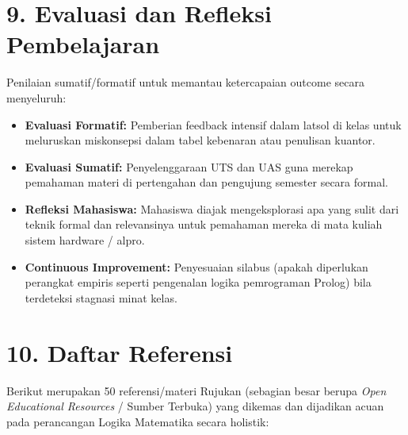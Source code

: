 \documentclass[12pt,a4paper]{article}
\begin{document}
\vspace{0.5cm}

\section*{9. Evaluasi dan Refleksi Pembelajaran}

Penilaian sumatif/formatif untuk memantau ketercapaian outcome secara menyeluruh:

\begin{itemize}[leftmargin=*]
  \item \textbf{Evaluasi Formatif:} Pemberian feedback intensif dalam latsol di kelas untuk meluruskan miskonsepsi dalam tabel kebenaran atau penulisan kuantor.
  \item \textbf{Evaluasi Sumatif:} Penyelenggaraan UTS dan UAS guna merekap pemahaman materi di pertengahan dan pengujung semester secara formal.
  \item \textbf{Refleksi Mahasiswa:} Mahasiswa diajak mengeksplorasi apa yang sulit dari teknik formal dan relevansinya untuk pemahaman mereka di mata kuliah sistem hardware / alpro.
  \item \textbf{Continuous Improvement:} Penyesuaian silabus (apakah diperlukan perangkat empiris seperti pengenalan logika pemrograman Prolog) bila terdeteksi stagnasi minat kelas.
\end{itemize}

\vspace{0.5cm}

\section*{10. Daftar Referensi}

Berikut merupakan 50 referensi/materi Rujukan (sebagian besar berupa \textit{Open Educational Resources} / Sumber Terbuka) yang dikemas dan dijadikan acuan pada perancangan Logika Matematika secara holistik:
\end{document}
